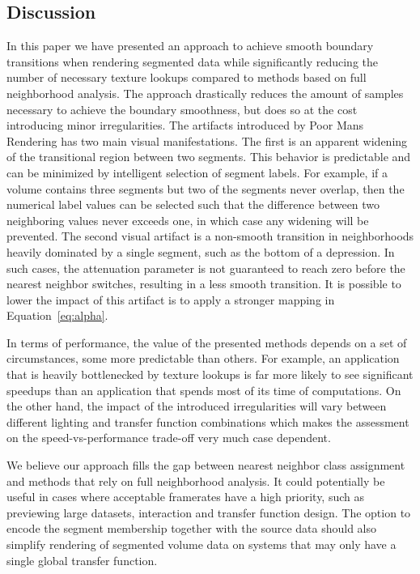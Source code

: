 \documentclass{egpubl}
\begin{document}
\subsection{Discussion}

In this paper we have presented an approach to achieve smooth boundary transitions when rendering segmented data while significantly reducing the number of necessary texture lookups compared to methods based on full neighborhood analysis. The approach drastically reduces the amount of samples necessary to achieve the boundary smoothness, but does so at the cost introducing minor irregularities. The artifacts introduced by Poor Mans Rendering has two main visual manifestations. The first is an apparent widening of the transitional region between two segments. This behavior is predictable and can be minimized by intelligent selection of segment labels. For example, if a volume contains three segments but two of the segments never overlap, then the numerical label values can be selected such that the difference between two neighboring values never exceeds one, in which case any widening will be prevented. The second visual artifact is a non-smooth transition in neighborhoods heavily dominated by a single segment, such as the bottom of a depression. In such cases, the attenuation parameter is not guaranteed to reach zero before the nearest neighbor switches, resulting in a less smooth transition. It is possible to lower the impact of this artifact is to apply a stronger mapping in Equation~\ref{eq:alpha}.

In terms of performance, the value of the presented methods depends on a set of circumstances, some more predictable than others. For example, an application that is heavily bottlenecked by texture lookups is far more likely to see significant speedups than an application that spends most of its time of computations. On the other hand, the impact of the introduced irregularities will vary between different lighting and transfer function combinations which makes the assessment on the speed-vs-performance trade-off very much case dependent. 

We believe our approach fills the gap between nearest neighbor class assignment and methods that rely on full neighborhood analysis. It could potentially be useful in cases where acceptable framerates have a high priority, such as previewing large datasets, interaction and transfer function design. The option to encode the segment membership together with the source data should also simplify rendering of segmented volume data on systems that may only have a single global transfer function. 
\end{document}
